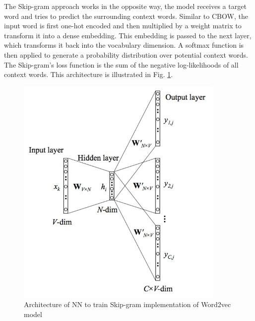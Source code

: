 The Skip-gram approach works in the opposite way, the model receives a target word and tries to predict the surrounding context words. Similar to CBOW, the input word is first one-hot encoded and then multiplied by a weight matrix to transform it into a dense embedding. This embedding is passed to the next layer, which transforms it back into the vocabulary dimension. A softmax function is then applied to generate a probability distribution over potential context words.
\\

The Skip-gram’s loss function is the sum of the negative log-likelihoods of all context words. This architecture is illustrated in Fig. \ref{fig:skip_arch}.
\begin{figure}[!h]
	\centering
	
	\includegraphics[width=0.9\textwidth]{images/Skip_arch.png}
	
	\caption{Architecture of NN to train Skip-gram implementation of Word2vec model \cite{skipgram}}
	\label{fig:skip_arch}
\end{figure}